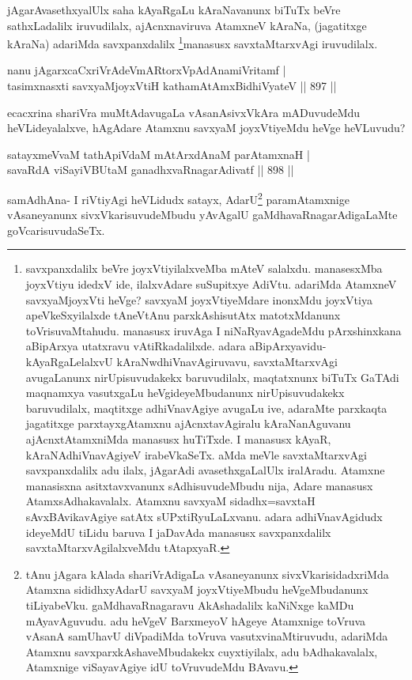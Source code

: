 \begin{artha}
jAgarAvasethxyalUlx saha kAyaRgaLu kAraNavanunx biTuTx beVre sathxLadalilx iruvudilalx, ajAcnxnaviruva AtamxneV kAraNa, (jagatitxge kAraNa) adariMda savxpanxdalilx \footnote{savxpanxdalilx beVre joyxVtiyilalxveMba mAteV salalxdu. manasesxMba joyxVtiyu idedxV ide, ilalxvAdare suSupitxye AdiVtu. adariMda AtamxneV savxyaMjoyxVti heVge? savxyaM joyxVtiyeMdare inonxMdu joyxVtiya apeVkeSxyilalxde tAneVtAnu parxkAshisutAtx matotxMdanunx toVrisuvaMtahudu. manasusx iruvAga I niNaRyavAgadeMdu pArxshinxkana aBipArxya utatxravu vAtiRkadalilxde. adara aBipArxyavidu-kAyaRgaLelalxvU kAraNwdhiVnavAgiruvavu, savxtaMtarxvAgi avugaLanunx nirUpisuvudakekx baruvudilalx, maqtatxnunx biTuTx GaTAdi maqnamxya vasutxgaLu  heVgideyeMbudanunx nirUpisuvudakekx baruvudilalx, maqtitxge adhiVnavAgiye avugaLu ive, adaraMte parxkaqta jagatitxge parxtayxgAtamxnu ajAcnxtavAgiralu kAraNanAguvanu ajAcnxtAtamxniMda manasusx huTiTxde. I manasusx kAyaR, kAraNAdhiVnavAgiyeV irabeVkaSeTx. aMda meVle savxtaMtarxvAgi savxpanxdalilx adu ilalx, jAgarAdi avasethxgaLalUlx iralAradu. Atamxne manasisxna asitxtavxvanunx sAdhisuvudeMbudu nija, Adare manasusx AtamxsAdhakavalalx. Atamxnu savxyaM sidadhx=savxtaH sAvxBAvikavAgiye satAtx sUPxtiRyuLaLxvanu. adara adhiVnavAgidudx ideyeMdU tiLidu baruva I jaDavAda manasusx savxpanxdalilx savxtaMtarxvAgilalxveMdu tAtapxyaR.}manasusx savxtaMtarxvAgi iruvudilalx.
\end{artha}


\begin{shl}
nanu jAgarxcaCxriVrAdeVmARtorxVpAdAnamiVritamf | \\
tasimxnasxti savxyaMjoyxVtiH kathamAtAmx\s BidhiVyateV \hfill||  897 ||  
\end{shl}

\begin{artha}
ecacxrina shariVra muMtAdavugaLa vAsanAsivxVkAra mADuvudeMdu heVLideyalalxve, hAgAdare Atamxnu savxyaM joyxVtiyeMdu heVge heVLuvudu?
\end{artha}

\begin{shl}
satayxmeVvaM tathA\s piVdaM mAtArxdAnaM parAtamxnaH | \\
savaRdA viSayiVBUtaM ganadhxvaRnagarAdivatf \hfill||  898 ||  
\end{shl}

\begin{artha}
samAdhAna- I riVtiyAgi heVLidudx satayx, AdarU\footnote{tAnu jAgara kAlada shariVrAdigaLa vAsaneyanunx sivxVkarisidadxriMda Atamxna sididhxyAdarU savxyaM joyxVtiyeMbudu heVgeMbudanunx tiLiyabeVku. gaMdhavaRnagaravu AkAshadalilx kaNiNxge kaMDu mAyavAguvudu. adu heVgeV BarxmeyoV hAgeye Atamxnige toVruva vAsanA samUhavU diVpadiMda toVruva vasutxvinaMtiruvudu, adariMda Atamxnu savxparxkAshaveMbudakekx cuyxtiyilalx, adu bAdhakavalalx, Atamxnige viSayavAgiye idU toVruvudeMdu BAvavu.} paramAtamxnige vAsaneyanunx sivxVkarisuvudeMbudu yAvAgalU gaMdhavaRnagarAdigaLaMte goVcarisuvudaSeTx.
\end{artha}

